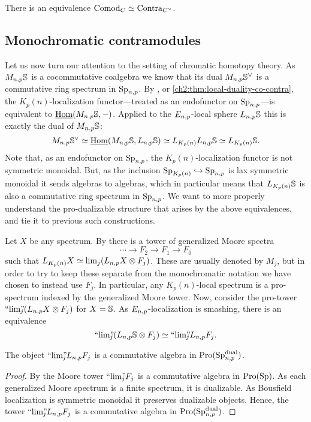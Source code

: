 \begin{corollary}
    There is an equivalence $\Comod_C \simeq \Contra_{C^\vee}$. 
\end{corollary}


\subsection{Monochromatic contramodules}

Let us now turn our attention to the setting of chromatic homotopy theory. As $M\np\S$ is a cocommutative coalgebra we know that its dual $M\np\S^\vee$ is a commutative ring spectrum in $\Sp\np$. By \cite[2.21(4)]{barthel-heard-valenzuela_2018}, or \cref{ch2:thm:local-duality-co-contra}, the $K_p(n)$-localization functor---treated as an endofunctor on $\Sp\np$---is equivalent to $\iHom(M\np\S,-)$. Applied to the $E\np$-local sphere $L\np\S$ this is exactly the dual of $M\np\S$:
\[M\np \S^\vee \simeq \iHom(M\np\S, L\np\S)\simeq L_\Kpn L\np\S \simeq L_\Kpn\S.\]
Note that, as an endofunctor on $\Sp\np$, the $K_p(n)$-localization functor is not symmetric monoidal. But, as the inclusion $\Sp_\Kpn\hookrightarrow \Sp\np$ is lax symmetric monoidal it sends algebras to algebras, which in particular means that $L_\Kpn\S$ is also a commutative ring spectrum in $\Sp\np$. We want to more properly understand the pro-dualizable structure that arises by the above equivalences, and tie it to previous such constructions. 

\begin{construction}
    Let $X$ be any spectrum. By \cite[4.22, 7.10(e)]{hovey-strickland_99} there is a tower of generalized Moore spectra 
    \[\cdots \to F_2 \to F_1 \to F_0\]
    such that $L_\Kpn X \simeq \lim_j (L\np X \otimes F_j)$. These are usually denoted by $M_j$, but in order to try to keep these separate from the monochromatic notation we have chosen to instead use $F_j$. In particular, any $K_p(n)$-local spectrum is a pro-spectrum indexed by the generalized Moore tower. Now, consider the pro-tower $\prolim (L\np X \otimes F_j)$ for $X=\S$. As $E\np$-localization is smashing, there is an equivalence 
    \[\prolim (L\np \S \otimes F_j)\simeq \prolim L\np F_j.\]
\end{construction}

\begin{lemma}
    \label{ch2:lm:Moore-tower-in-local-dualizable}
    The object $\prolim L\np F_j$ is a commutative algebra in $\Pro(\Sp\np\dual)$. 
\end{lemma}
\begin{proof}
    By \cite[6.3]{davis-lawson_2014} the Moore tower $\prolim F_j$ is a commutative algebra in $\Pro(\Sp)$. As each generalized Moore spectrum is a finite spectrum, it is dualizable. As Bousfield localization is symmetric monoidal it preserves dualizable objects. Hence, the tower $\prolim L\np F_j$ is a commutative algebra in $\Pro(\Sp\np\dual)$. 
\end{proof}

